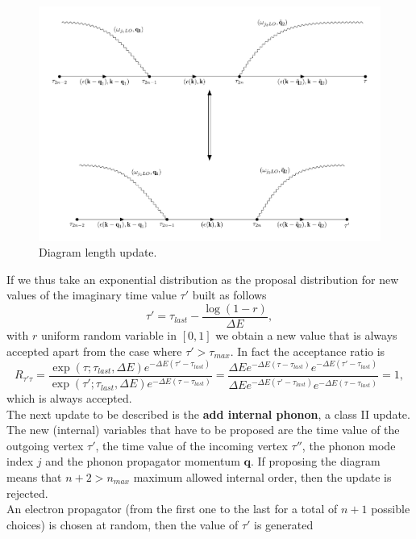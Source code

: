 \begin{figure}[H]
    \centering
    \includegraphics[scale=0.6]{diagram_length_v2.pdf}
    \caption{Diagram length update.}
    \label{fig:length_update}
\end{figure}
If we thus take an exponential distribution as the proposal distribution for new values of the imaginary time value $\tau'$ built as follows
\begin{equation}
    \tau'=\tau_{last}-\frac{\log{\left(1-r\right)}}{\Delta E},
\end{equation}
with $r$ uniform random variable in $[0,1]$ we obtain a new value that is always accepted apart from the case where $\tau'>\tau_{max}$. In fact the acceptance ratio is
\begin{equation}
    R_{\tau'\tau}=\frac{\exp{\left(\tau;\tau_{last},\Delta E\right)}e^{-\Delta E(\tau'-\tau_{last})}}{\exp{\left(\tau';\tau_{last},\Delta E\right)}e^{-\Delta E (\tau-\tau_{last})}}=\frac{\Delta E e^{-\Delta E(\tau-\tau_{last})}e^{-\Delta E (\tau'-\tau_{last})}}{\Delta E e^{-\Delta E(\tau'-\tau_{last})}e^{-\Delta E (\tau-\tau_{last})}}=1,
\end{equation}
which is always accepted.\\
The next update to be described is the \textbf{add internal phonon}, a class II update. The new (internal) variables that have to be proposed 
are the time value of the outgoing vertex $\tau'$, the time value of the incoming vertex $\tau''$, the phonon mode index $j$ and the phonon propagator 
momentum $\mathbf{q}$. If proposing the diagram means that $n+2>n_{max}$ maximum allowed internal order, then the update is rejected.\\
An electron propagator (from the first one to the last for a total of $n+1$ possible choices) is chosen at random, then the value of $\tau'$ is generated 
